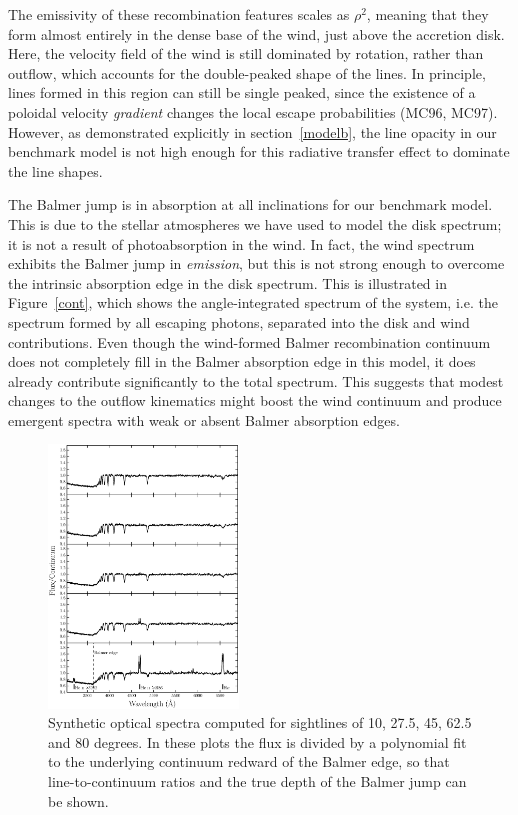\documentclass[preprint, a4paper, 11pt]{aastex}
\begin{document}
The emissivity of these recombination 
features scales as $\rho^2$, meaning that they form almost entirely in the 
dense base of the wind, just above the accretion disk. Here, the
velocity field of the wind is still dominated by rotation, rather than
outflow, which accounts for the double-peaked shape of the lines. In
principle, lines formed in this region can still be single peaked,
since the existence of a poloidal velocity {\em gradient} changes the
local escape probabilities (MC96, MC97). However, as
demonstrated explicitly in section~\ref{modelb}, the line opacity in our
benchmark model is not high enough for this radiative transfer effect
to dominate the line shapes.

The Balmer jump is in absorption at all inclinations for our benchmark
model. This is due to the stellar atmospheres we have used to
model the disk spectrum; it is not a result of photoabsorption in the
wind. In fact, the wind spectrum exhibits the Balmer jump in {\em
emission}, but this is not strong enough to overcome the intrinsic
absorption edge in the disk spectrum. This is illustrated in
Figure~\ref{cont}, which shows the angle-integrated spectrum of the system,
i.e. the spectrum formed by all escaping photons, separated into the
disk and wind contributions. Even though the wind-formed Balmer
recombination continuum does not completely fill in the Balmer
absorption edge in this model, it does already contribute
significantly to the total spectrum. This suggests that modest changes 
to the outflow kinematics might boost the wind continuum and produce
emergent spectra with weak or absent Balmer absorption edges. 

\begin{figure} 
\includegraphics[width=0.45\textwidth]{figures/modela_opt_cont.eps}
\caption{Synthetic optical spectra computed for 
sightlines of 10, 27.5, 45, 62.5 and 80 degrees. In these plots
the flux is divided by a polynomial fit to the 
underlying continuum redward of the Balmer edge, so that 
line-to-continuum ratios and the true depth of the
Balmer jump can be shown.}
\label{spec_continuum}
\end{figure} 
\end{document}
